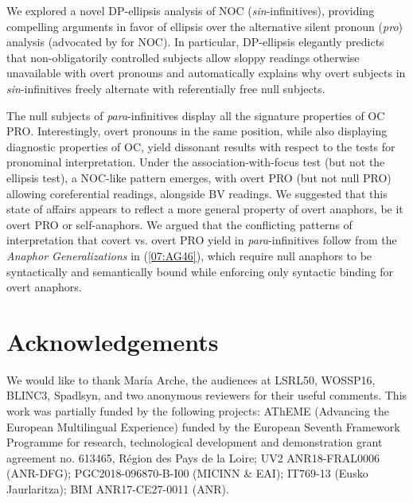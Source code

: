 \documentclass[output=paper,colorlinks,citecolor=brown,draft,draftmode]{langscibook}
\begin{document}
We explored a novel DP-ellipsis analysis of NOC (\textit{sin}-infinitives), providing compelling arguments in favor of ellipsis over the alternative silent pronoun (\textit{pro}) analysis (advocated by \citealt{hornstein99} for NOC). In particular, DP-ellipsis elegantly predicts that non-obligatorily controlled subjects allow sloppy readings otherwise unavailable with overt pronouns and automatically explains why overt subjects in \textit{sin}-infinitives freely alternate with referentially free null subjects.

The null subjects of \textit{para}-infinitives display all the signature properties of OC PRO. Interestingly, overt pronouns in the same position, while also displaying diagnostic properties of OC, yield dissonant results with respect to the tests for pronominal interpretation. Under the association-with-focus test (but not the ellipsis test), a NOC-like pattern emerges, with overt PRO (but not null PRO) allowing coreferential readings, alongside BV readings. We suggested that this state of affairs appears to reflect a more general property of overt anaphors, be it overt PRO or self-anaphors. We argued that the conflicting patterns of interpretation that covert vs. overt PRO yield in \textit{para}-infinitives follow from the \textit{Anaphor Generalizations} in (\ref{07:AG46}), which require null anaphors to be syntactically and semantically bound while enforcing only syntactic binding for overt anaphors.



\section*{Acknowledgements}
We would like to thank María Arche, the audiences at
LSRL50,
WOSSP16,
BLINC3,
Spadlsyn,
and two anonymous reviewers for their useful comments.
This work was partially funded by the following projects: AThEME (Advancing the European Multilingual Experience) funded by the European Seventh Framework Programme for research, technological development and demonstration grant agreement no. 613465, Région des Pays de la Loire; UV2 ANR18-FRAL0006 (ANR-DFG); PGC2018-096870-B-I00 (MICINN \& EAI); IT769-13 (Eusko Jaurlaritza); BIM ANR17-CE27-0011 (ANR).

\printbibliography[heading=subbibliography,notkeyword=this]
\end{document}
